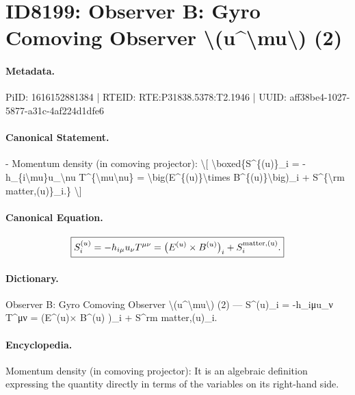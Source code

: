 \section*{ID8199: Observer B: Gyro Comoving Observer \textbackslash{}(u\textasciicircum{}\textbackslash{}mu\textbackslash{}) (2)}
\paragraph{Metadata.}
PiID: 1616152881384 | RTEID: RTE:P31838.5378:T2.1946 | UUID: aff38be4-1027-5877-a31c-4af224d1dfe6

\paragraph{Canonical Statement.}
- Momentum density (in comoving projector): \textbackslash{}[ \textbackslash{}boxed\{S\textasciicircum{}\{(u)\}\_i = -h\_\{i\textbackslash{}mu\}u\_\textbackslash{}nu T\textasciicircum{}\{\textbackslash{}mu\textbackslash{}nu\} = \textbackslash{}big(E\textasciicircum{}\{(u)\}\textbackslash{}times B\textasciicircum{}\{(u)\}\textbackslash{}big)\_i + S\textasciicircum{}\{\textbackslash{}rm matter,(u)\}\_i.\} \textbackslash{}]

\paragraph{Canonical Equation.}
\[
\boxed{S^{(u)}_i = -h_{i\mu}u_\nu T^{\mu\nu} = \big(E^{(u)}\times B^{(u)}\big)_i + S^{\rm matter,(u)}_i.}
\]

\paragraph{Dictionary.}
Observer B: Gyro Comoving Observer \textbackslash{}(u\textasciicircum{}\textbackslash{}mu\textbackslash{}) (2) — S\textasciicircum{}(u)\_i = -h\_iμu\_ν T\textasciicircum{}μν = (E\textasciicircum{}(u)× B\textasciicircum{}(u) )\_i + S\textasciicircum{}rm matter,(u)\_i.

\paragraph{Encyclopedia.}
Momentum density (in comoving projector): It is an algebraic definition expressing the quantity directly in terms of the variables on its right-hand side.
